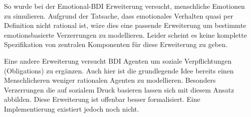 So wurde bei der Emotional-BDI\cite{pereira2005towards} %
Erweiterung versucht, menschliche Emotionen zu simulieren.
Aufgrund der Tatsache, dass emotionales Verhalten quasi per Definition nicht rational ist, wäre dies eine passende Erweiterung um bestimmte emotionsbasierte Verzerrungen zu modellieren.
Leider scheint es keine komplette Spezifikation von zentralen Komponenten für diese Erweiterung zu geben\cite[paragraph 4.16]{balke2014agents}.

Eine andere Erweiterung versucht BDI Agenten um soziale Verpflichtungen (Obligations) zu ergänzen.
Auch hier ist die grundlegende Idee bereits einen Menschlicheren weniger rationalen Agenten zu modellieren.
Besonders Verzerrungen die auf sozialem Druck basieren lassen sich mit diesem Ansatz abbilden.
Diese Erweiterung ist offenbar besser formalisiert.
Eine Implementierung existiert jedoch noch nicht\cite[stand 2015]{balke2014agents}.

